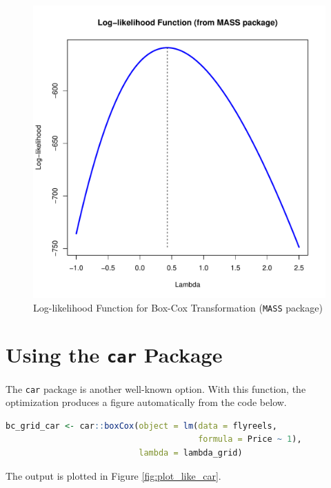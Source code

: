 \begin{figure}[h!]
  \centering
  \includegraphics[scale = 0.5, keepaspectratio=true]{../Figures/plot_like_MASS}
  \caption{Log-likelihood Function for Box-Cox Transformation (\texttt{MASS} package)} \label{fig:plot_like_MASS}
\end{figure}


\clearpage
\section{Using the \texttt{car} Package}

The \texttt{car} package is another well-known option.
With this function, the optimization produces 
a figure automatically from the code below.

\begin{lstlisting}[language=R]
bc_grid_car <- car::boxCox(object = lm(data = flyreels,
                                       formula = Price ~ 1),
                           lambda = lambda_grid)
\end{lstlisting}

The output is plotted in Figure \ref{fig:plot_like_car}.

